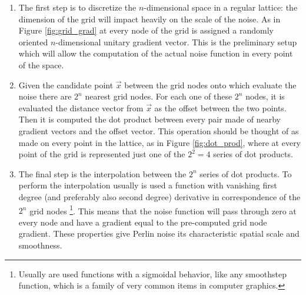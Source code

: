 \begin{enumerate}
    \item The first step is to discretize the $n$-dimensional space in a regular lattice: the dimension of the grid will impact heavily on the scale of the noise. As in Figure \ref{fig:grid_grad} at every node of the grid is assigned a randomly oriented $n$-dimensional unitary gradient vector. This is the preliminary setup which will allow the computation of the actual noise function in every point of the space.

    \item Given the candidate point $\vec x$ between the grid nodes onto which evaluate the noise there are $2^n$ nearest grid nodes. For each one of these $2^n$ nodes, it is evaluated the distance vector from $\vec x$ as the offset between the two points. Then it is computed the dot product between every pair made of nearby gradient vectors and the offset vector. This operation should be thought of as made on every point in the lattice, as in Figure \ref{fig:dot_prod}, where at every point of the grid is represented just one of the $2^2 = 4$ series of dot products.

    \item The final step is the interpolation between the $2^n$ series of dot products. To perform the interpolation usually is used a function with vanishing first degree (and preferably also second degree) derivative in correspondence of the $2^n$ grid nodes \footnote{Usually are used functions with a sigmoidal behavior, like any smoothstep function, which is a family of very common items in computer graphics.}. This means that the noise function will pass through zero at every node and have a gradient equal to the pre-computed grid node gradient. These properties give Perlin noise its characteristic spatial scale and smoothness.
\end{enumerate}

